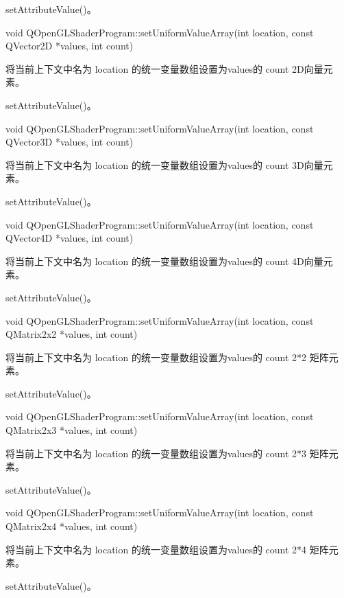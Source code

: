 \begin{seeAlso}
setAttributeValue()。
\end{seeAlso}

void QOpenGLShaderProgram::setUniformValueArray(int location, const QVector2D *values, int count)

将当前上下文中名为 location 的统一变量数组设置为values的 count 2D向量元素。


\begin{seeAlso}
setAttributeValue()。
\end{seeAlso}

void QOpenGLShaderProgram::setUniformValueArray(int location, const QVector3D *values, int count)

将当前上下文中名为 location 的统一变量数组设置为values的 count 3D向量元素。

\begin{seeAlso}
setAttributeValue()。
\end{seeAlso}

void QOpenGLShaderProgram::setUniformValueArray(int location, const QVector4D *values, int count)

将当前上下文中名为 location 的统一变量数组设置为values的 count 4D向量元素。

\begin{seeAlso}
setAttributeValue()。
\end{seeAlso}

void QOpenGLShaderProgram::setUniformValueArray(int location, const QMatrix2x2 *values, int count)

将当前上下文中名为 location 的统一变量数组设置为values的 count 2*2 矩阵元素。

\begin{seeAlso}
setAttributeValue()。
\end{seeAlso}

void QOpenGLShaderProgram::setUniformValueArray(int location, const QMatrix2x3 *values, int count)

将当前上下文中名为 location 的统一变量数组设置为values的 count 2*3 矩阵元素。

\begin{seeAlso}
setAttributeValue()。
\end{seeAlso}

void QOpenGLShaderProgram::setUniformValueArray(int location, const QMatrix2x4 *values, int count)

将当前上下文中名为 location 的统一变量数组设置为values的 count 2*4 矩阵元素。

\begin{seeAlso}
setAttributeValue()。
\end{seeAlso}

